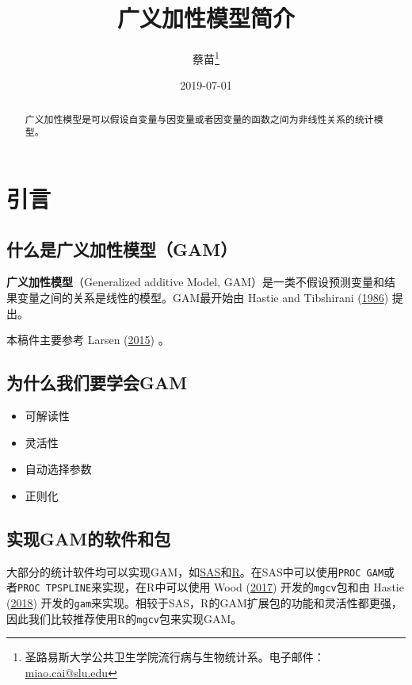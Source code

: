 \documentclass[]{ctexart}
\title{广义加性模型简介}
\author{蔡苗\footnote{圣路易斯大学公共卫生学院流行病与生物统计系。电子邮件：
  \url{miao.cai@slu.edu}}}
\date{2019-07-01}
\providecommand{\tightlist}{%
  \setlength{\itemsep}{0pt}\setlength{\parskip}{0pt}}
\begin{document}
\maketitle
\begin{abstract}
广义加性模型是可以假设自变量与因变量或者因变量的函数之间为非线性关系的统计模型。
\end{abstract}

{
\setcounter{tocdepth}{2}
\tableofcontents
}
\clearpage
\doublespacing

\hypertarget{section}{%
\section{引言}\label{section}}

\hypertarget{gam}{%
\subsection{什么是广义加性模型（GAM）}\label{gam}}

\textbf{广义加性模型}（Generalized additive Model,
GAM）是一类不假设预测变量和结果变量之间的关系是线性的模型。GAM最开始由
Hastie and Tibshirani
(\protect\hyperlink{ref-hastie1986generalized}{1986}) 提出。

本稿件主要参考 Larsen (\protect\hyperlink{ref-larsen2015gam}{2015}) 。

\hypertarget{gam-1}{%
\subsection{为什么我们要学会GAM}\label{gam-1}}

\begin{itemize}
\tightlist
\item
  可解读性
\item
  灵活性
\item
  自动选择参数
\item
  正则化
\end{itemize}

\hypertarget{gam-2}{%
\subsection{实现GAM的软件和包}\label{gam-2}}

大部分的统计软件均可以实现GAM，如\href{https://www.sas.com/en_us/home.html}{SAS}和\href{https://www.r-project.org/}{R}。在SAS中可以使用\texttt{PROC\ GAM}或者\texttt{PROC\ TPSPLINE}来实现，在R中可以使用
Wood (\protect\hyperlink{ref-wood2017generalized}{2017})
开发的\texttt{mgcv}包和由 Hastie (\protect\hyperlink{ref-Rgam}{2018})
开发的\texttt{gam}来实现。相较于SAS，R的GAM扩展包的功能和灵活性都更强，因此我们比较推荐使用R的\texttt{mgcv}包来实现GAM。
\end{document}
